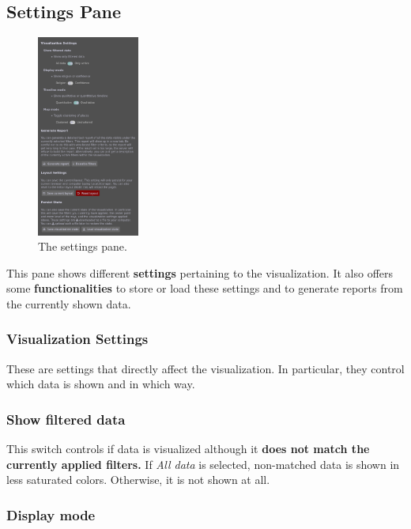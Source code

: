 \subsection{Settings Pane}
\label{sec:settings-pane}

\begin{figure}[tb]
  \centering
  \includegraphics[width=0.3\textwidth]{../src/assets/visualization-documentation/settings.png}
  \caption{
    The settings pane.
  }
  \label{fig:settings}
\end{figure}

This pane shows different \textbf{settings} pertaining to the visualization.
It also offers some \textbf{functionalities} to store or load these settings and to generate reports from the currently shown data.


\subsubsection{Visualization Settings}
\label{sec:settings-vis-settings}

These are settings that directly affect the visualization.
In particular, they control which data is shown and in which way.

\subsubsection{Show filtered data}
\label{sec:settings-all-data-only-active}

This switch controls if data is visualized although it \textbf{does not match the currently applied filters.}
If \emph{All data} is selected, non-matched data is shown in less saturated colors.
Otherwise, it is not shown at all.


\subsubsection{Display mode}
\label{sec:settings-display-mode}

